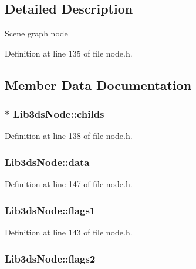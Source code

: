 \subsection{Detailed Description}
Scene graph node 

Definition at line 135 of file node.\-h.



\subsection{Member Data Documentation}
\hypertarget{struct_lib3ds_node_a4ddee45f16c70ea837bb7e0d87917e97}{
\subsubsection[{childs}]{$\ast$ Lib3ds\-Node\-::childs}}\label{struct_lib3ds_node_a4ddee45f16c70ea837bb7e0d87917e97}


Definition at line 138 of file node.\-h.

\hypertarget{struct_lib3ds_node_a41d4f0ca2153d5d663e7a973ff07ed7e}{
\subsubsection[{data}]{ Lib3ds\-Node\-::data}}\label{struct_lib3ds_node_a41d4f0ca2153d5d663e7a973ff07ed7e}


Definition at line 147 of file node.\-h.

\hypertarget{struct_lib3ds_node_ae5a6639389c00fed8158c806d1536dd3}{
\subsubsection[{flags1}]{ Lib3ds\-Node\-::flags1}}\label{struct_lib3ds_node_ae5a6639389c00fed8158c806d1536dd3}


Definition at line 143 of file node.\-h.

\hypertarget{struct_lib3ds_node_a99fe1027a561faf17cdff4fef1206738}{
\subsubsection[{flags2}]{ Lib3ds\-Node\-::flags2}}\label{struct_lib3ds_node_a99fe1027a561faf17cdff4fef1206738}


